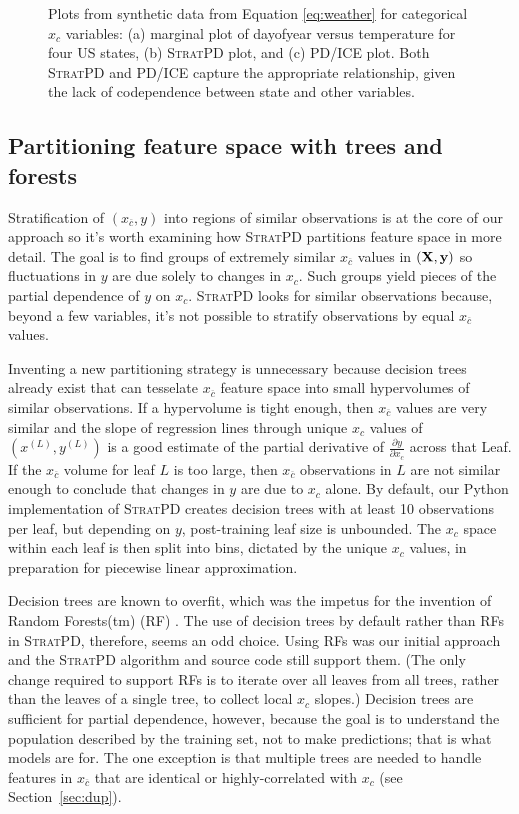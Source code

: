 \documentclass[12pt]{article}
\newcommand{\secref}[1]{Section~\ref{#1}}
\newcommand{\spd}{\fontfamily{cmr}\textsc{\small StratPD}}
\newcommand{\xnc}{$x_{\overline{c}}$}
\begin{document}
\begin{figure}[htbp]
\begin{center}
\caption{Plots from synthetic data from Equation \eqref{eq:weather} for categorical $x_c$ variables: (a) marginal plot of dayofyear versus temperature for four US states, (b) \spd{} plot, and (c) PD/ICE plot. Both \spd{} and PD/ICE capture the appropriate relationship, given the lack of codependence between state and other variables.}
\label{fig:state_vs_temp}
\end{center}
\end{figure}

\subsection{Partitioning feature space with trees and forests}\label{sec:partitioning}

Stratification of $(x_{\overline{c}}, y)$ into regions of similar observations is at the core of our approach so it's worth examining how \spd{} partitions feature space in more detail.  The goal is to find groups of extremely similar \xnc{} values in $({\bf X}, {\bf y})$ so fluctuations in $y$ are due solely to changes in $x_c$. Such groups yield pieces of the partial dependence of $y$ on $x_c$. \spd{} looks for similar observations because, beyond a few variables, it's not possible to stratify observations by equal \xnc{} values. 

Inventing a new partitioning strategy is unnecessary because decision trees already exist that can tesselate \xnc{} feature space into small hypervolumes of similar observations. If a hypervolume is tight enough, then \xnc{} values are very similar and the slope of regression lines through unique $x_c$ values of $(x^{(L)}, y^{(L)})$ is a good estimate of the partial derivative of $\frac{\partial y}{\partial x_{c}}$ across that Leaf.  If the \xnc{} volume for leaf $L$ is too large, then \xnc{} observations in $L$ are not similar enough to conclude that changes in $y$ are due to $x_c$ alone. By default, our Python implementation of \spd{} creates decision trees with at least 10 observations per leaf, but depending on $y$, post-training leaf size is unbounded. The $x_c$ space within each leaf is then split into bins, dictated by the unique $x_c$ values, in preparation for piecewise linear approximation.

Decision trees are known to overfit, which was the impetus for the invention of Random Forests(tm) (RF) \cite{RF}.  The use of decision trees by default rather than RFs in \spd, therefore, seems an odd choice. Using RFs was our initial approach and the \spd{} algorithm and source code still support them. (The only change required to support RFs is to iterate over all leaves from all trees, rather than the leaves of a single tree, to collect local $x_c$ slopes.)  Decision trees are sufficient for partial dependence, however, because the goal is to understand the population described by the training set, not to make predictions; that is what models are for. The one exception is that multiple trees are needed to handle features in \xnc{} that are identical or highly-correlated with $x_c$ (see \secref{sec:dup}).
\end{document}
